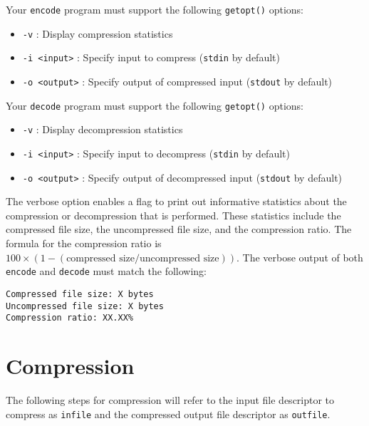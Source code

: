 \documentclass{article}
\begin{document}
Your \texttt{encode} program must support the following \texttt{getopt()}
options:

\begin{itemize}
    \item \texttt{-v} : Display compression statistics

    \item \texttt{-i <input>} : Specify input to compress (\texttt{stdin} by
        default)

    \item \texttt{-o <output>} : Specify output of compressed input
        (\texttt{stdout} by default)
\end{itemize}

Your \texttt{decode} program must support the following \texttt{getopt()}
options:

\begin{itemize}
    \item \texttt{-v} : Display decompression statistics

    \item \texttt{-i <input>} : Specify input to decompress (\texttt{stdin} by
        default)

    \item \texttt{-o <output>} : Specify output of decompressed input
        (\texttt{stdout} by default)
\end{itemize}

The verbose option enables a flag to print out informative statistics about the
compression or decompression that is performed. These statistics include the
compressed file size, the uncompressed file size, and the compression ratio.
The formula for the compression ratio is $100\times(1-(\text{compressed size} /
\text{uncompressed size}))$. The verbose output of both \texttt{encode} and
\texttt{decode} must match the following:

\begin{lstlisting}
Compressed file size: X bytes
Uncompressed file size: X bytes
Compression ratio: XX.XX%
\end{lstlisting}

\section{Compression}
The following steps for compression will refer to the input file descriptor to
compress as \texttt{infile} and the compressed output file descriptor as
\texttt{outfile}.
\end{document}
